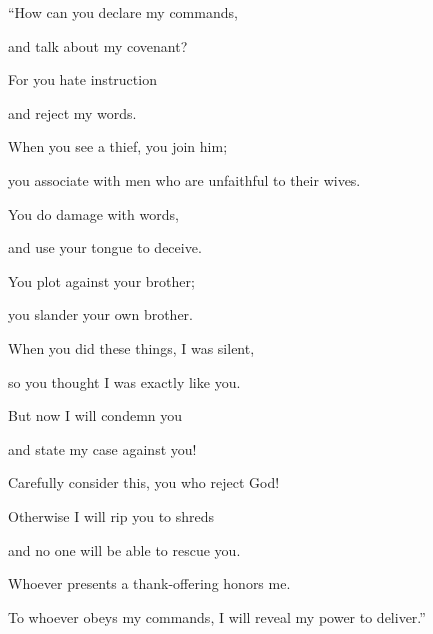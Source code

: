 {\par }{\Q “How
can you declare
my commands,
\par }{\Q and talk
about my covenant?
\par }{\Q {}For you
hate
instruction
\par }{\Q and reject
my words.
\par }{\Q {}When
you see
a thief,
you join
him;
\par }{\Q you associate
with
men
who are unfaithful
to their wives.
\par }{\Q {}You do damage
with words,
\par }{\Q and use
your tongue
to deceive.
\par }{\Q {}You plot against
your brother;
\par }{\Q you slander
your own brother.
\par }{\Q {}When you did
these
things, I was silent,
\par }{\Q so you thought
I was exactly like
you.

\par }{\Q But now
I will
condemn
you
\par }{\Q and state
my case against you!
\par }{\Q {}Carefully
consider
this,
you who reject
God!

\par }{\Q Otherwise
I will rip you to shreds
\par }{\Q and no
one will be able to rescue you.
\par }{\Q {}Whoever presents a thank-offering
honors
me.

\par }{\Q To whoever obeys my commands,
I will reveal
my power
to deliver.”


\par }
